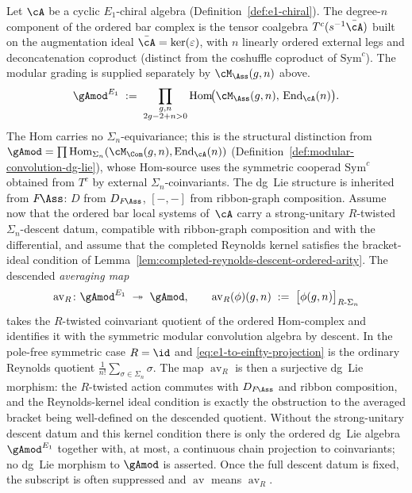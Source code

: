 \begin{definition}
\label{def:e1-modular-convolution}
Let $\cA$ be a cyclic $E_1$-chiral algebra
(Definition~\ref{def:e1-chiral}).
The degree-$n$ component of the ordered bar complex is the tensor
coalgebra $T^c(s^{-1}\bar\cA)$ built on the augmentation ideal
$\bar\cA = \ker(\varepsilon)$, with $n$ linearly ordered external
legs and deconcatenation coproduct (distinct from the coshuffle
coproduct of $\mathrm{Sym}^c$). The modular grading is supplied
separately by $\cM_{\Ass}(g,n)$ above.
\begin{equation}
\label{eq:e1-modular-convolution}
{\gAmod}^{E_1}
\;:=\;
\prod_{\substack{g,n \\ 2g-2+n > 0}}
\operatorname{Hom}\!\bigl(
\cM_{\Ass}(g,n),\,
\operatorname{End}_{\cA}(n)
\bigr).
\end{equation}
The Hom carries no $\Sigma_n$-equivariance; this is the structural
distinction from $\gAmod =
\prod \operatorname{Hom}_{\Sigma_n}(\cM_\Com(g,n),
\operatorname{End}_\cA(n))$
(Definition~\ref{def:modular-convolution-dg-lie}), whose Hom-source
uses the symmetric cooperad $\mathrm{Sym}^c$ obtained from $T^c$ by external
$\Sigma_n$-coinvariants. The dg~Lie structure is inherited from
$F\!\Ass$: $D$ from $D_{F\!\Ass}$, $[-,-]$ from ribbon-graph
composition.
Assume now that the ordered bar local systems of~$\cA$ carry a
strong-unitary $R$-twisted $\Sigma_n$-descent datum, compatible with
ribbon-graph composition and with the differential, and assume that
the completed Reynolds kernel satisfies the bracket-ideal condition of
Lemma~\ref{lem:completed-reynolds-descent-ordered-arity}. The descended
\emph{averaging map}
\begin{equation}
\label{eq:e1-to-einfty-projection}
\operatorname{av}_R\colon
{\gAmod}^{E_1}
\;\twoheadrightarrow\;
\gAmod,
\qquad
\operatorname{av}_R(\phi)(g,n)
\;:=\;
\bigl[\phi(g,n)\bigr]_{R\text{-}\Sigma_n}
\end{equation}
takes the $R$-twisted coinvariant quotient of the ordered Hom-complex
and identifies it with the symmetric modular convolution algebra by
descent. In the pole-free symmetric case $R=\id$ and
\eqref{eq:e1-to-einfty-projection} is the ordinary Reynolds quotient
$\frac{1}{n!}\sum_{\sigma\in\Sigma_n}\sigma$. The map
$\operatorname{av}_R$ is then a surjective dg~Lie morphism: the
$R$-twisted action commutes with $D_{F\!\Ass}$ and ribbon composition,
and the Reynolds-kernel ideal condition is exactly the obstruction to
the averaged bracket being well-defined on the descended quotient.
Without the strong-unitary descent datum and this kernel condition
there is only the ordered dg~Lie algebra ${\gAmod}^{E_1}$ together
with, at most, a continuous chain projection to coinvariants; no
dg~Lie morphism to $\gAmod$ is asserted. Once the full descent datum is
fixed, the subscript is often suppressed and $\operatorname{av}$ means
$\operatorname{av}_R$.
\end{definition}

